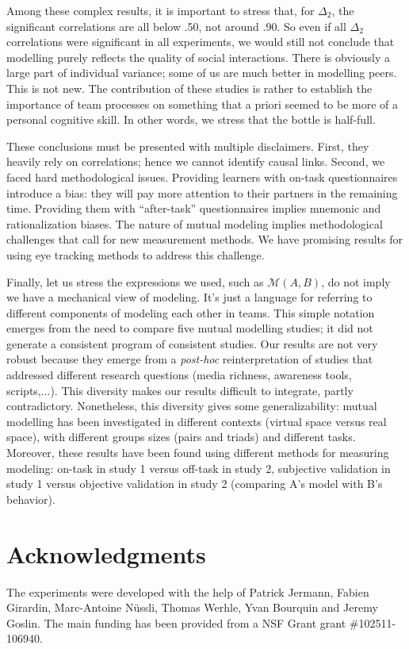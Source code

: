 \documentclass[twocolumn]{article}
\newcommand{\gmodel}[2]{{$\mathcal{M}(#1, #2)$}}
\begin{document}
Among these complex results, it is important to stress that, for $\Delta_2$, the
significant correlations are all below .50, not around .90.  So even if all
$\Delta_2$ correlations were significant in all experiments, we would still not
conclude that modelling purely reflects the quality of social interactions.
There is obviously a large part of individual variance; some of us are much
better in modelling peers. This is not new. The contribution of these studies is
rather to establish the importance of team processes on something that a priori
seemed to be more of a personal cognitive skill.  In other words, we stress that
the bottle is half-full. 

These conclusions must be presented with multiple disclaimers. First, they
heavily rely on correlations; hence we cannot identify causal links. Second, we
faced hard methodological issues. Providing learners with on-task questionnaires
introduce a bias: they will pay more attention to their partners in the
remaining time. Providing them with ``after-task'' questionnaires implies mnemonic
and rationalization biases. The nature of mutual modeling implies methodological
challenges that call for new  measurement methods. We have promising results for
using eye tracking methods to address this challenge.

Finally, let us stress the expressions we used, such as \gmodel{A}{B}, do not
imply we have a mechanical view of modeling. It's just a language for referring
to different components of modeling each other in teams.  This simple notation
emerges from the need to compare five mutual modelling studies; it did not
generate a consistent program of consistent studies.  Our results are not very
robust because they emerge from a \emph{post-hoc} reinterpretation of studies
that addressed different research questions (media richness, awareness tools,
scripts,...). This diversity makes our results difficult to integrate, partly
contradictory. Nonetheless, this diversity gives some generalizability: mutual
modelling has been investigated in different contexts (virtual space versus real
space), with different groups sizes (pairs and triads) and different tasks.
Moreover, these results have been found using different methods for measuring
modeling: on-task in study 1 versus off-task in study 2, subjective validation
in study 1 versus objective validation in study 2 (comparing A's model with B's
behavior).

\section*{Acknowledgments}

The experiments were developed with the help of Patrick Jermann,  Fabien
Girardin, Marc-Antoine Nüssli, Thomas Werhle, Yvan Bourquin and  Jeremy Goslin.
The main funding has been provided from a NSF Grant grant \#102511-106940.



\end{document}
